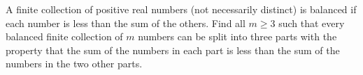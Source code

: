 A finite collection of positive real numbers (not necessarily distinct) is balanced if each number is less than the sum of the others. Find all $m \ge 3$ such that every balanced finite collection of $m$ numbers can be split into three parts with the property that the sum of the numbers in each part is less than the sum of the numbers in the two other parts.